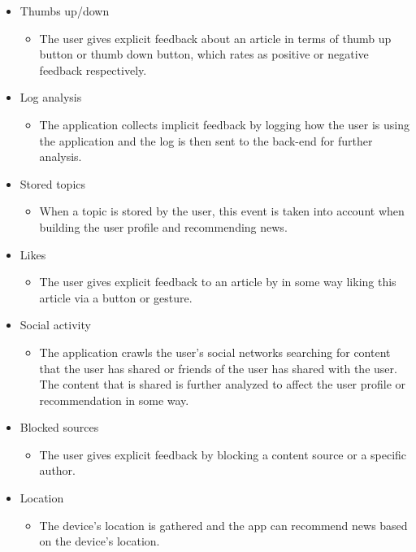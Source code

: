 \begin{itemize}
	\item Thumbs up/down
	\begin{itemize}
		\item The user gives explicit feedback about an article in terms of thumb up button or thumb down button, which rates as positive or negative feedback respectively.
	\end{itemize}

	\item Log analysis
	\begin{itemize}
		\item The application collects implicit feedback by logging how the user is using the application and the log is then sent to the back-end for further analysis.
	\end{itemize}

	\item Stored topics
	\begin{itemize}
		\item When a topic is stored by the user, this event is taken into account when building the user profile and recommending news.
	\end{itemize}

	\item Likes
	\begin{itemize}
		\item The user gives explicit feedback to an article by in some way liking this article via a button or gesture.
	\end{itemize}

	\item Social activity
	\begin{itemize}
		\item The application crawls the user's social networks searching for content that the user has shared or friends of the user has shared with the user. The content that is shared is further analyzed to affect the user profile or recommendation in some way.
	\end{itemize}

	\item Blocked sources
	\begin{itemize}
		\item The user gives explicit feedback by blocking a content source or a specific author.
	\end{itemize}

	\item Location
	\begin{itemize}
		\item The device's location is gathered and the app can recommend news based on the device's location.
	\end{itemize}


\end{itemize}
